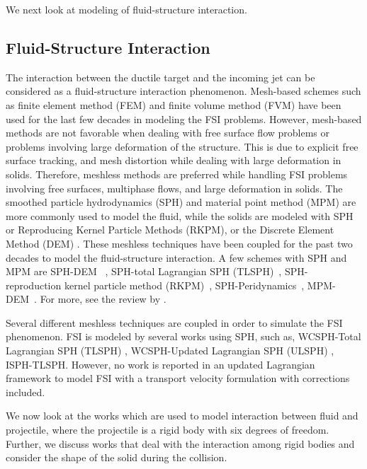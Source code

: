 We next look at modeling of fluid-structure interaction.


\subsection{Fluid-Structure Interaction}
The interaction between the ductile target and the incoming jet can be
considered as a fluid-structure interaction phenomenon. Mesh-based schemes such
as finite element method (FEM) \citep{lozovskiy2015unconditionally} and finite
volume method (FVM) \citep{jasak2007updated} have been used for the last few
decades in modeling the FSI problems. However, mesh-based methods are not
favorable when dealing with free surface flow problems or problems involving
large deformation of the structure. This is due to explicit free surface
tracking, and mesh distortion \citep{moresi2003lagrangian} while dealing with
large deformation in solids. Therefore, meshless methods are preferred while
handling FSI problems involving free surfaces, multiphase flows, and large
deformation in solids. The smoothed particle hydrodynamics (SPH) and material
point method (MPM) are more commonly used to model the fluid, while the
solids are modeled with SPH or Reproducing Kernel Particle Methods (RKPM), or
the Discrete Element Method (DEM) \citep{hu2010material,li2022material}. These
meshless techniques have been coupled for the past two decades to model the
fluid-structure interaction. A few schemes with SPH and MPM are SPH-DEM~
\citep{wu2016coupled}, SPH-total Lagrangian SPH
(TLSPH)~\citep{salehizadeh2022coupled}, SPH-reproduction kernel particle method
(RKPM)~\citep{peng2021coupling}, SPH-Peridynamics~\citep{sun2020smoothed},
MPM-DEM~\citep{singer2022partitioned}. For more, see the review by
\citep{khayyer2022systematic}.

Several different meshless techniques are coupled in order to simulate the FSI
phenomenon. FSI is modeled by several works using SPH, such as, WCSPH-Total
Lagrangian SPH (TLSPH) \citep{zhan2019stabilized}, WCSPH-Updated Lagrangian SPH
(ULSPH) \citep{antoci2007numerical}, ISPH-TLSPH\citep{salehizadeh2022coupled}.
However, no work is reported in an updated Lagrangian framework to model FSI
with a transport velocity formulation with corrections included.


We now look at the works which are used to model interaction between fluid and
projectile, where the projectile is a rigid body with six degrees of freedom.
Further, we discuss works that deal with the interaction among rigid bodies and
consider the shape of the solid during the collision.


